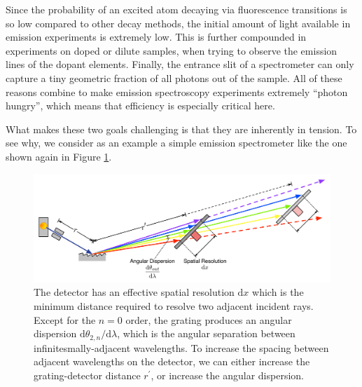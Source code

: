 Since the probability of an excited atom decaying via fluorescence transitions is so low compared to other decay methods, the initial amount of light available in emission experiments is extremely low.  This is further compounded in experiments on doped or dilute samples, when trying to observe the emission lines of the dopant elements.  Finally, the entrance slit of a spectrometer can only capture a tiny geometric fraction of all photons out of the sample.  All of these reasons combine to make emission spectroscopy experiments extremely ``photon hungry'', which means that efficiency is especially critical here.

What makes these two goals challenging is that they are inherently in tension.  To see why, we consider as an example a simple emission spectrometer like the one shown again in Figure \ref{1f}.

\begin{figure}[htbp] %
   \centering
   \hspace*{-0.4in}\includegraphics[scale=0.8]{../data/Chapter1/1f_spectrometerResolution/1f_2.pdf} 
   \caption{The detector has an effective spatial resolution $\mathrm{d}x$ which is the minimum distance required to resolve two adjacent incident rays.  Except for the $n=0$ order, the grating produces an angular dispersion $\mathrm{d}\theta_{2,n}/\mathrm{d}\lambda$, which is the angular separation between infinitesmally-adjacent wavelengths.  To increase the spacing between adjacent wavelengths on the detector, we can either increase the grating-detector distance $r^\prime$, or increase the angular dispersion. }
   \label{1f}
\end{figure}
               
